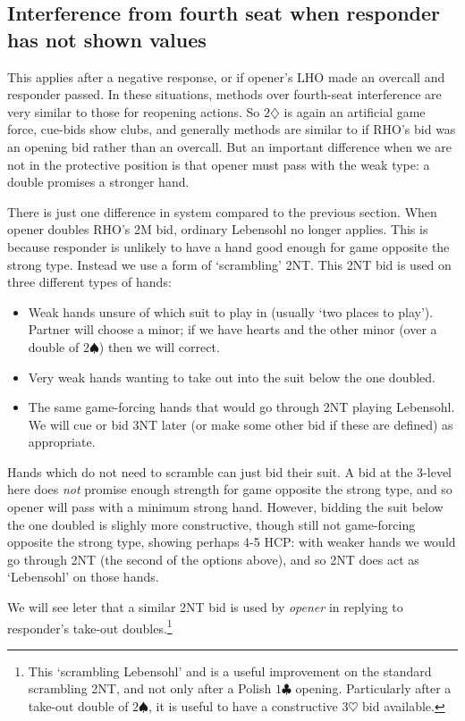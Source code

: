 \documentclass{article}
\newcommand{\sz}{\spadesuit}
\newcommand{\hz}{\heartsuit}
\newcommand{\dz}{\diamondsuit}
\newcommand{\cz}{\clubsuit}
\begin{document}
\subsection{Interference from fourth seat when responder has not shown values}

This applies after a negative response, or if opener's LHO made an overcall and responder passed. In these situations, methods over fourth-seat interference are very similar to those for reopening actions. So $2\dz$ is again an artificial game force, cue-bids show clubs, and generally methods are similar to if RHO's bid was an opening bid rather than an overcall. But an important difference when we are not in the protective position is that opener must pass with the weak type: a double promises a stronger hand.

There is just one difference in system compared to the previous section. When opener doubles RHO's 2M bid, ordinary Lebensohl no longer applies. This is because responder is unlikely to have a hand good enough for game opposite the strong type. Instead we use a form of `scrambling' 2NT. This 2NT bid is used on three different types of hands:
\begin{itemize}
\item Weak hands unsure of which suit to play in (usually `two places to play'). Partner will choose a minor; if we have hearts and the other minor (over a double of $2\sz$) then we will correct.
\item Very weak hands wanting to take out into the suit below the one doubled.
\item The same game-forcing hands that would go through 2NT playing Lebensohl. We will cue or bid 3NT later (or make some other bid if these are defined) as appropriate.
\end{itemize}
Hands which do not need to scramble can just bid their suit. A bid at the 3-level here does \emph{not} promise enough strength for game opposite the strong type, and so opener will pass with a minimum strong hand. However, bidding the suit below the one doubled is slighly more constructive, though still not game-forcing opposite the strong type, showing perhaps 4-5 HCP: with weaker hands we would go through 2NT (the second of the options above), and so 2NT does act as `Lebensohl' on those hands.

We will see leter that a similar 2NT bid is used by \emph{opener} in replying to responder's take-out doubles.\footnote{This `scrambling Lebensohl' and is a useful improvement on the standard scrambling 2NT, and not only after a Polish $1\cz$ opening. Particularly after a take-out double of $2\sz$, it is useful to have a constructive $3\hz$ bid available.}
\end{document}
